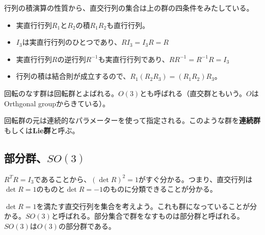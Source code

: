\documentclass[10pt,a4paper]{jarticle}
\begin{document}
行列の積演算の性質から、直交行列の集合は上の群の四条件をみたしている。
\begin{itemize}
\item 実直行行列$R_1$と$R_2$の積$R_1 R_2$も直行行列。
\item $I_3$は実直行行列のひとつであり、$R I_3 = I_3 R = R$
\item 実直行行列$R$の逆行列$R^{-1}$も実直行行列であり、$R R^{-1} = R^{-1} R = I_3$
\item 行列の積は結合則が成立するので、$R_1 (R_2 R_3) = (R_1 R_2) R_3$。
\end{itemize}
回転のなす群は回転群とよばれる。$O(3)$とも呼ばれる（直交群ともいう。$O$はOrthgonal groupからきている）。

回転群の元は連続的なパラメーターを使って指定される。このような群を\textbf{連続群}もしくは\textbf{Lie群}と呼ぶ。

\subsection{部分群、$SO(3)$}
$R^T R = I_3$であることから、$(\det R)^2 = 1$がすぐ分かる。つまり、直交行列は$\det R=1$のものと$\det R=-1$のものに分類できることが分かる。

$\det R=1$を満たす直交行列を集合を考えよう。これも群になっていることが分かる。$SO(3)$と呼ばれる。部分集合で群をなすものは部分群と呼ばれる。$SO(3)$は$O(3)$の部分群である。
\end{document}
